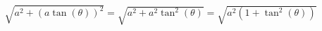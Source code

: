 \documentclass[preview]{standalone}
\begin{document}
\begin{align*}
\sqrt{a^2+(a\tan(\theta))^2} =\sqrt{a^2+a^2\tan^2(\theta)} = \sqrt{a^2(1+\tan^2(\theta))}
\end{align*}
\end{document}
